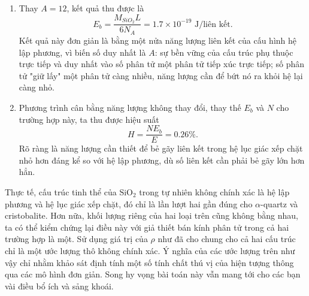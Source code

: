 \begin{enumerate}[label=(\alph*)]
\begin{equation}
        \sigma=\frac{3}{2}\times \frac{1}{2\sqrt{3}r^2}=\frac{\sqrt{3}}{4r^2}.
    \end{equation}
    Qua đó số liên kết bị bẻ gãy bằng \begin{equation}
        N=lc\sigma=\frac{\sqrt{3}lc}{4r^2}\approx 5.6\times 10^{14}\text{~liên kết}.
    \end{equation}
    \item[(e)] Thay $A=12$, kết quả thu được là \begin{equation}
        E_b =\frac{M_{SiO_2}L}{6N_A}=1.7\times 10^{-19}\text{~J/liên kết}.
    \end{equation} Kết quả này đơn giản là bằng một nửa năng lượng liên kết của cấu hình hệ lập phương, vì biến số duy nhất là $A$: sự bền vững của cấu trúc phụ thuộc trực tiếp và duy nhất vào số phân tử một phân tử tiếp xúc trực tiếp; số phân tử "giữ lấy" một phân tử càng nhiều, năng lượng cần để bứt nó ra khỏi hệ lại càng nhỏ. 
    \item[(f)] Phương trình cân bằng năng lượng không thay đổi, thay thế $E_b$ và $N$ cho trường hợp này, ta thu được hiệu suất \begin{equation}
        H=\frac{NE_b}{E}=0.26\%.
    \end{equation}
    Rõ ràng là năng lượng cần thiết để bẻ gãy liên kết trong hệ lục giác xếp chặt nhỏ hơn đáng kể so với hệ lập phương, dù số liên kết cần phải bẻ gãy lớn hơn hẳn.
\end{enumerate}
Thực tế, cấu trúc tinh thể của $\mathrm{SiO_2}$ trong tự nhiên không chính xác là hệ lập phương và hệ lục giác xếp chặt, đó chỉ là lần lượt hai gần đúng cho $\alpha$-quartz và cristobalite. Hơn nữa, khối lượng riêng của hai loại trên cũng không bằng nhau, ta có thể kiểm chứng lại điều này với giả thiết bán kính phân tử trong cả hai trường hợp là một. Sử dụng giá trị của $\rho$ như đã cho chung cho cả hai cấu trúc chỉ là một ước lượng thô không chính xác. Ý nghĩa của các ước lượng trên như vậy chỉ nhằm khảo sát định tính một số tính chất thú vị của hiện tượng thông qua các mô hình đơn giản. Song hy vọng bài toán này vẫn mang tới cho các bạn vài điều bổ ích và sảng khoái.
\vspace{0.5cm}

